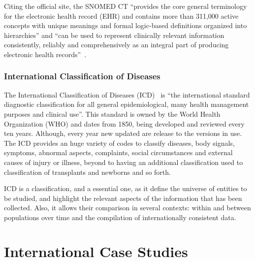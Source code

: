Citing the official site, the SNOMED CT ``provides the core general terminology for the electronic health record (EHR) and contains more than 311,000 active concepts with unique meanings and formal logic-based definitions organized into hierarchies'' and ``can be used to represent clinically relevant information consistently, reliably and comprehensively as an integral part of producing electronic health records''~\citep{IHTSDO}.


\subsubsection{International Classification of Diseases} \label{sec:icd}

The International Classification of Diseases (ICD)~\citep{WHO} is ``the international standard diagnostic classification for all general epidemiological, many health management purposes and clinical use''. This standard is owned by the World Health Organization (WHO) and dates from 1850, being developed and reviewed every ten years. Although, every year new updated are release to the versions in use. The ICD provides an huge variety of codes to classify diseases, body signals, symptoms, abnormal aspects, complaints, social circumstances and external causes of injury or illness, beyond to having an additional classification used to classification of transplants and newborns and so forth. 

ICD is a classification, and a essential one, as it define the universe of entities to be studied, and highlight the relevant aspects of the information that has been collected. Also, it allows their comparison in several contexts: within and between populations over time and the compilation of internationally consistent data.










\section{International Case Studies}

